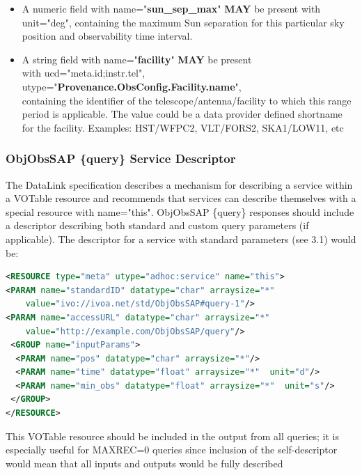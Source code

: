 \documentclass[11pt,a4paper]{ivoatex/ivoa}
\begin{document}
\begin{itemize}
\item {A numeric field with name="\textbf{sun\_sep\_max}" \textbf{MAY }be present with
unit="deg", containing the maximum Sun separation for this particular sky position and observability time interval.}

\item {A string field with name="\textbf{facility}" \textbf{MAY} be present\\
with ucd="meta.id;instr.tel",\\
utype="\textbf{Provenance.ObsConfig.Facility.name}",\\
containing the identifier of the telescope/antenna/facility to which
this range period is applicable. The value could be a data provider
defined shortname for the facility. 
Examples: HST/WFPC2, VLT/FORS2, SKA1/LOW11, etc}
\end{itemize}

\subsubsection{ObjObsSAP \{query\} Service Descriptor}
The DataLink specification describes a mechanism for describing a
service within a VOTable resource and recommends that services can
describe themselves with a special resource with name="this". ObjObsSAP
\{query\} responses should include a descriptor describing both standard
and custom query parameters (if applicable). The descriptor for a
service with standard parameters (see 3.1) would be:\\

\begin{lstlisting}[language=XML]
<RESOURCE type="meta" utype="adhoc:service" name="this">
<PARAM name="standardID" datatype="char" arraysize="*"
    value="ivo://ivoa.net/std/ObjObsSAP#query-1"/>
<PARAM name="accessURL" datatype="char" arraysize="*"
    value="http://example.com/ObjObsSAP/query"/>
 <GROUP name="inputParams">
  <PARAM name="pos" datatype="char" arraysize="*"/>
  <PARAM name="time" datatype="float" arraysize="*"	 unit="d"/>
  <PARAM name="min_obs" datatype="float" arraysize="*"	unit="s"/>
 </GROUP>
</RESOURCE>
\end{lstlisting}

This VOTable resource should be included in the output from all queries;
it is especially useful for MAXREC=0 queries since inclusion of the
self-descriptor would mean that all inputs and outputs would be fully
described
\end{document}
